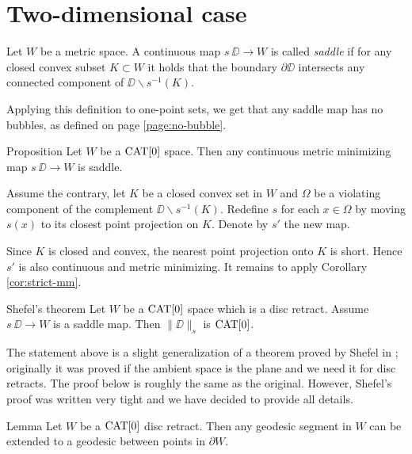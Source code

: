 \documentclass{article}
\begin{document}
\section{Two-dimensional case}

Let $W$ be a metric space.
A continuous map $s\:\DD\to W$ is called \emph{saddle} if for any closed convex subset $K\subset W$ it holds that
the boundary $\partial \DD$ intersects
any connected component of $\DD\backslash s^{-1}(K)$.

Applying this definition to one-point sets,
we get that any saddle map has no bubbles, 
as defined on page \ref{page:no-bubble}.


\begin{thm}{Proposition}\label{prop:memisaddle}
Let $W$ be a $\mathop{\rm CAT}\nolimits[0]$ space. Then any continuous metric minimizing map $s\:\DD\to W$ is saddle.
\end{thm}

Assume the contrary, let $K$ be a closed convex set in $W$
and $\Omega$ be a violating component of the complement $\DD\backslash s^{-1}(K)$. 
Redefine $s$ for each $x\in\Omega$ by moving 
$s(x)$ to its closest point projection on $K$.
Denote by $s'$ the new map. 

Since $K$ is closed and convex, the nearest point projection onto $K$ is short.
Hence $s'$ is also continuous and metric minimizing. 
It remains to apply Corollary \ref{cor:strict-mm}.
\qeds

 






\begin{thm}{Shefel's theorem}\label{thm:shefel-2D}
Let $W$ be a $\mathop{\rm CAT}\nolimits[0]$ space which is a disc retract.
Assume $s\:\DD\to W$ is a saddle map. 
Then $\|\DD\|_s$ is $\mathop{\rm CAT}\nolimits[0]$.
\end{thm}

The statement above is a slight generalization of a theorem proved by Shefel in \cite{shefel-2D};
originally it was proved if the ambient space is the plane and we need it for disc retracts.
The proof below is roughly the same as the original.
However, Shefel's proof was written very tight
and we have decided to provide all details.


\begin{thm}{Lemma}\label{lem:extension}
Let $W$ be a $\mathop{\rm CAT}\nolimits[0]$ disc retract. 
Then any geodesic segment in $W$ can be extended to a geodesic between points in $\partial W$.
\end{thm}
\end{document}
